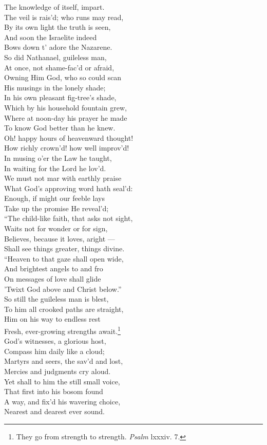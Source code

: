  The knowledge of itself, impart. \\
  The veil is rais’d; who runs may read, \\
 By its own light the truth is seen, \\
 And soon the Israelite indeed \\
 Bows down t’ adore the Nazarene. \\
  So did Nathanael, guileless man, \\
 At once, not shame-fac’d or afraid, \\
 Owning Him God, who so could scan \\
 His musings in the lonely shade; \\
  In his own pleasant fig-tree’s shade, \\
 Which by his household fountain grew, \\
 Where at noon-day his prayer he made \\
 To know God better than he knew. \\
  Oh! happy hours of heavenward thought! \\
 How richly crown’d! how well improv’d! \\
 In musing o’er the Law he taught, \\
 In waiting for the Lord he lov’d. \\
  We must not mar with earthly praise \\
 What God’s approving word hath seal’d: \\
 Enough, if might our feeble lays \\
 Take up the promise He reveal’d; \\
  “The child-like faith, that asks not sight, \\
 Waits not for wonder or for sign, \\
 Believes, because it loves, aright — \\
 Shall see things greater, things divine. \\
  “Heaven to that gaze shall open wide, \\
 And brightest angels to and fro \\
 On messages of love shall glide \\
 ’Twixt God above and Christ below.” \\
  So still the guileless man is blest, \\
 To him all crooked paths are straight, \\
 Him on his way to endless rest \\
 Fresh, ever-growing strengths await.\footnote{They go from strength to strength. \emph{Psalm} lxxxiv. 7.} \\
  God’s witnesses, a glorious host, \\
 Compass him daily like a cloud; \\
 Martyrs and seers, the sav’d and lost, \\
 Mercies and judgments cry aloud. \\
  Yet shall to him the still small voice, \\
 That first into his bosom found \\
 A way, and fix’d his wavering choice, \\
 Nearest and dearest ever sound.\\

